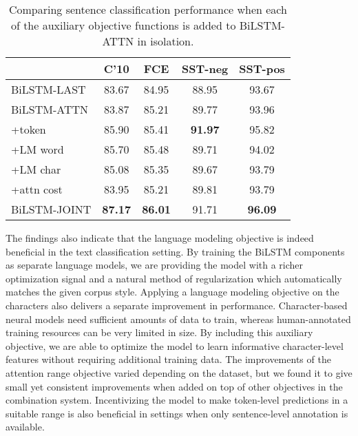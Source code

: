 \documentclass[letterpaper]{article} \usepackage{aaai19}  \usepackage{times}  \usepackage{helvet}  \usepackage{courier}  \usepackage{graphicx}
\begin{document}
\begin{table}[t]
\centering
\setlength\tabcolsep{7pt}
\begin{tabular}{l|cccc} \toprule
 & {\small C'10} & {\small FCE} & {\small SST-neg} & {\small SST-pos} \\ \midrule
{\small BiLSTM-LAST} & 83.67 & 84.95 & 88.95 & 93.67 \\ \midrule
{\small BiLSTM-ATTN} & 83.87 & 85.21 & 89.77 & 93.96 \\
 +token & 85.90 & 85.41 & \textbf{91.97} & 95.82 \\
 +{\small LM} word & 85.70 & 85.48 & 89.71 & 94.02 \\
 +{\small LM} char & 85.08 & 85.35 & 89.67 & 93.79 \\
 +attn cost & 83.95 & 85.21 & 89.81 & 93.79 \\ \midrule
{\small BiLSTM-JOINT} & \textbf{87.17} & \textbf{86.01} & 91.71 & \textbf{96.09} \\ \bottomrule
\end{tabular}
\caption{Comparing sentence classification performance when each of the auxiliary objective functions is added to {\small BiLSTM-ATTN} in isolation.}
\label{tab:results3}
\end{table}







The findings also indicate that the language modeling objective is indeed beneficial in the text classification setting. By training the BiLSTM components as separate language models, we are providing the model with a richer optimization signal and a natural method of regularization which automatically matches the given corpus style. 
Applying a language modeling objective on the characters also delivers a separate improvement in performance. Character-based neural models need sufficient amounts of data to train, whereas human-annotated training resources can be very limited in size. By including this auxiliary objective, we are able to optimize the model to learn informative character-level features without requiring additional training data.
The improvements of the attention range objective varied depending on the dataset, but we found it to give small yet consistent improvements when added on top of other objectives in the combination system. Incentivizing the model to make token-level predictions in a suitable range is also beneficial in settings when only sentence-level annotation is available.
\end{document}
